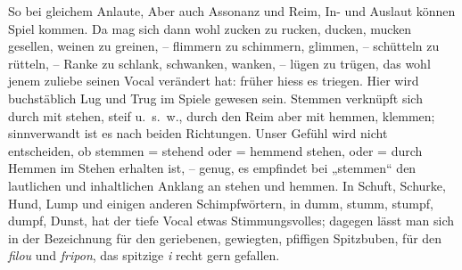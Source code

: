 {So bei gleichem Anlaute,  Aber auch Assonanz und Reim, In- und Auslaut können  Spiel kommen. Da mag sich dann wohl zucken zu rucken, ducken, mucken gesellen, weinen zu greinen, – flimmern zu schimmern, glimmen,  – schütteln zu rütteln, – Ranke zu schlank, schwanken, wanken, – lügen zu trügen, das wohl jenem zuliebe seinen Vocal verändert hat: früher hiess es triegen. Hier wird buchstäblich Lug und Trug im Spiele gewesen sein. Stemmen verknüpft sich durch  mit stehen, steif u.~s.~w., durch den Reim aber mit hemmen, klemmen; sinnverwandt ist es nach beiden Richtungen. Unser Gefühl wird nicht entscheiden, ob stemmen = stehend  oder = hemmend stehen, oder  = durch Hemmen im Stehen erhalten ist, – genug, es empfindet bei „stemmen“ den lautlichen und inhaltlichen Anklang an stehen und hemmen. In Schuft, Schurke, Hund, Lump und einigen anderen Schimpfwörtern, in dumm, stumm, stumpf, dumpf, Dunst,  hat der tiefe Vocal etwas Stimmungsvolles; dagegen lässt man sich in der Bezeichnung für den geriebenen, gewiegten, pfiffigen Spitzbuben, für den \textit{filou} und \textit{fripon}, das spitzige \textit{i} recht gern gefallen.

}
